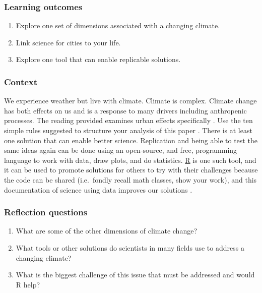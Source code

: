 \documentclass[
]{book}
\providecommand{\tightlist}{%
  \setlength{\itemsep}{0pt}\setlength{\parskip}{0pt}}
\begin{document}
\hypertarget{learning-outcomes-1}{%
\subsubsection*{Learning outcomes}\label{learning-outcomes-1}}

\begin{enumerate}
\def\labelenumi{\arabic{enumi}.}
\tightlist
\item
  Explore one set of dimensions associated with a changing climate.
\item
  Link science for cities to your life.\\
\item
  Explore one tool that can enable replicable solutions.
\end{enumerate}

\hypertarget{context}{%
\subsubsection*{Context}\label{context}}

We experience weather but live with climate. Climate is complex. Climate change has both effects on us and is a response to many drivers including anthropenic processes. The reading provided examines urban effects specifically \citep{RN5995}. Use the ten simple rules suggested to structure your analysis of this paper \citep{RN6861}. There is at least one solution that can enable better science. Replication and being able to test the same ideas again can be done using an open-source, and free, programming language to work with data, draw plots, and do statistics. \href{https://www.r-project.org}{R} is one such tool, and it can be used to promote solutions for others to try with their challenges because the code can be shared (i.e.~fondly recall math classes, show your work), and this documentation of science using data improves our solutions \citep{RN4523}.

\hypertarget{reflection-questions}{%
\subsubsection*{Reflection questions}\label{reflection-questions}}

\begin{enumerate}
\def\labelenumi{\arabic{enumi}.}
\tightlist
\item
  What are some of the other dimensions of climate change?
\item
  What tools or other solutions do scientists in many fields use to address a changing climate?
\item
  What is the biggest challenge of this issue that must be addressed and would R help?
\end{enumerate}
\end{document}
